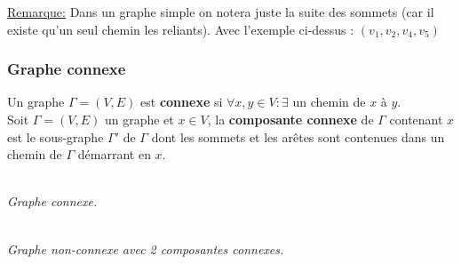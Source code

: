 \documentclass[11pt]{article}
\begin{document}
		\underline{Remarque:} Dans un graphe simple on notera juste la suite des sommets (car il existe qu'un seul chemin les reliants). Avec l'exemple ci-dessus : $(v_1,v_2,v_4,v_5)$

		\subsubsection{Graphe connexe}
					Un graphe $\Gamma=(V,E)$ est \textbf{connexe} si $\forall x,y \in V : \exists$ un chemin de $x$ à $y$.\\
					
					Soit $\Gamma = (V,E)$ un graphe et $x \in V$, la \textbf{composante connexe} de $\Gamma$ contenant $x$ est le sous-graphe $\Gamma'$ de $\Gamma$ dont les sommets et les arêtes sont contenues dans un chemin de $\Gamma$ démarrant en $x$.\\ %
					
					\begin{minipage}{0.5\textwidth}
						\centering
						 \\
						\textit{Graphe connexe.}
						\end{minipage}\hfill
						\begin{minipage}{0.5\textwidth}
						\centering
						 \\
						\textit{Graphe non-connexe avec 2 composantes connexes.}
						\end{minipage}
			
\end{document}
